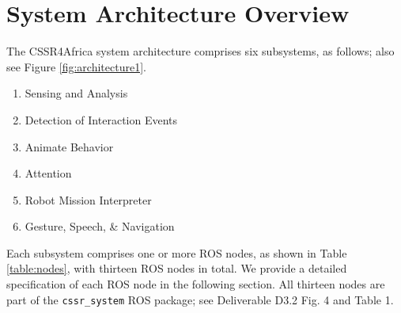 \documentclass{CSSRforAfrica}
\begin{document}
\section{System Architecture Overview}

The CSSR4Africa system architecture comprises six subsystems, as follows; also see Figure \ref{fig:architecture1}.
\begin{enumerate}
\item Sensing and Analysis
\vspace{-2mm}
\item Detection of Interaction Events
\vspace{-2mm}
\item Animate Behavior
\vspace{-2mm}
\item Attention
\vspace{-2mm}
\item Robot Mission Interpreter
\vspace{-2mm}
\item Gesture, Speech, \& Navigation
\end{enumerate}
Each subsystem comprises one or more ROS nodes, as shown in Table \ref{table:nodes}, with thirteen ROS nodes in total.
We provide a detailed specification of each ROS node in the following section.
All thirteen nodes are part of the  {\small \verb+cssr_system+}   ROS package; see Deliverable D3.2 Fig. 4 and Table 1.
\end{document}
